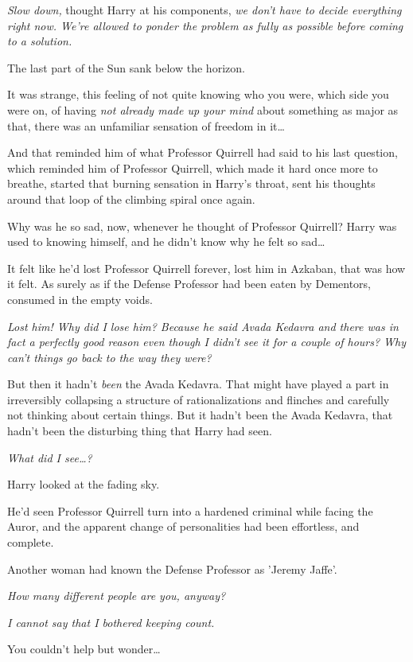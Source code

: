 \emph{Slow down,} thought Harry at his components,\emph{ we don't have to 
decide everything right now. We're allowed to ponder the problem as fully as 
possible before coming to a solution.}

The last part of the Sun sank below the horizon.

It was strange, this feeling of not quite knowing who you were, which side you 
were on, of having \emph{not already made up your mind} about something as 
major as that, there was an unfamiliar sensation of freedom in it{\ldots}

And that reminded him of what Professor Quirrell had said to his last question, 
which reminded him of Professor Quirrell, which made it hard once more to 
breathe, started that burning sensation in Harry's throat, sent his thoughts 
around that loop of the climbing spiral once again.

Why was he so sad, now, whenever he thought of Professor Quirrell? Harry was 
used to knowing himself, and he didn't know why he felt so sad{\ldots}

It felt like he'd lost Professor Quirrell forever, lost him in Azkaban, that 
was how it felt. As surely as if the Defense Professor had been eaten by 
Dementors, consumed in the empty voids.

\emph{Lost him! Why did I lose him? Because he said Avada Kedavra and there was 
in fact a perfectly good reason even though I didn't see it for a couple of 
hours? Why can't things go back to the way they were?}

But then it hadn't \emph{been} the Avada Kedavra. That might have played a part 
in irreversibly collapsing a structure of rationalizations and flinches and 
carefully not thinking about certain things. But it hadn't been the Avada 
Kedavra, that hadn't been the disturbing thing that Harry had seen.

\emph{What did I see{\ldots}?}

Harry looked at the fading sky.

He'd seen Professor Quirrell turn into a hardened criminal while facing the 
Auror, and the apparent change of personalities had been effortless, and 
complete.

Another woman had known the Defense Professor as 'Jeremy Jaffe'.

\emph{How many different people are you, anyway?}

\emph{I cannot say that I bothered keeping count.}

You couldn't help but wonder{\ldots}


